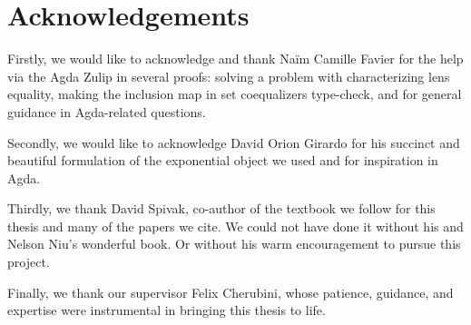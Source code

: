 \thispagestyle{plain}			%
\section*{Acknowledgements}
Firstly, we would like to acknowledge and thank Naïm Camille Favier for the help via the Agda Zulip in several proofs: solving a problem with characterizing lens equality, making the inclusion map in set coequalizers type-check, and for general guidance in Agda-related questions.


Secondly, we would like to acknowledge David Orion Girardo for his succinct and beautiful formulation of the exponential object we used and for inspiration in Agda.


Thirdly, we thank David Spivak, co-author of the textbook we follow for this thesis and many of the papers we cite. We could not have done it without his and Nelson Niu's wonderful book. Or without his warm encouragement to pursue this project.

Finally, we thank our supervisor Felix Cherubini, whose patience, guidance, and expertise were instrumental in bringing this thesis to life.


\newpage				%
\thispagestyle{empty}
\mbox{}
